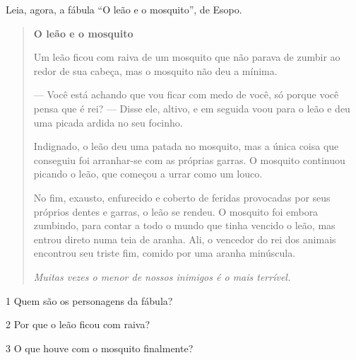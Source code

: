 
Leia, agora, a fábula ``O leão e o mosquito'', de Esopo.


\begin{quote}
\textbf{O leão e o mosquito}

Um leão ficou com raiva de um mosquito que não parava de zumbir ao redor
de sua cabeça, mas o mosquito não deu a mínima.

--- Você está achando que vou ficar com medo de você, só porque você
pensa que é rei? --- Disse ele, altivo, e em seguida voou para o leão e
deu uma picada ardida no seu focinho.

Indignado, o leão deu uma patada no mosquito, mas a única coisa que
conseguiu foi arranhar-se com as próprias garras. O mosquito continuou
picando o leão, que começou a urrar como um louco.

No fim, exausto, enfurecido e
coberto de feridas provocadas por seus próprios dentes e garras, o leão
se rendeu. O mosquito foi embora zumbindo, para contar a todo o mundo que
tinha vencido o leão, mas entrou direto numa teia de aranha. Ali, o
vencedor do rei dos animais encontrou seu triste fim, comido por uma
aranha minúscula.

\emph{Muitas vezes o menor de nossos inimigos é o mais terrível.}

\end{quote}

\num{1} Quem são os personagens da fábula?


\num{2} Por que o leão ficou com raiva?


\num{3} O que houve com o mosquito finalmente?

